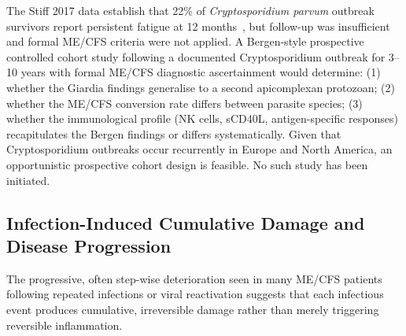 \begin{open_question}
\label{oq:cryptosporidium-longitudinal}
The Stiff 2017 data establish that 22\% of \emph{Cryptosporidium parvum} outbreak survivors report persistent fatigue at 12 months~\cite{Stiff2017cryptosporidium}, but follow-up was insufficient and formal ME/CFS criteria were not applied. A Bergen-style prospective controlled cohort study following a documented Cryptosporidium outbreak for 3--10 years with formal ME/CFS diagnostic ascertainment would determine: (1) whether the Giardia findings generalise to a second apicomplexan protozoan; (2) whether the ME/CFS conversion rate differs between parasite species; (3) whether the immunological profile (NK cells, sCD40L, antigen-specific responses) recapitulates the Bergen findings or differs systematically. Given that Cryptosporidium outbreaks occur recurrently in Europe and North America, an opportunistic prospective cohort design is feasible. No such study has been initiated.
\end{open_question}

\subsection{Infection-Induced Cumulative Damage and Disease Progression}

The progressive, often step-wise deterioration seen in many ME/CFS patients following repeated infections or viral reactivation suggests that each infectious event produces cumulative, irreversible damage rather than merely triggering reversible inflammation.

